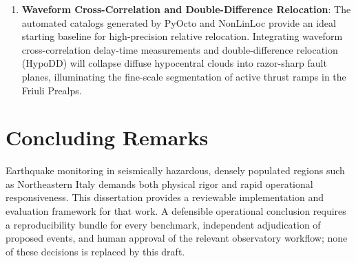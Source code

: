 \begin{enumerate}
    automatically deliver focal mechanism solutions for events with
    $M_{\mathrm{L}} \ge 2.5$ within minutes of origin.
  \item \textbf{Waveform Cross-Correlation and Double-Difference Relocation}:
    The automated catalogs generated by PyOcto and NonLinLoc provide
    an ideal starting baseline for high-precision relative
    relocation. Integrating waveform cross-correlation delay-time
    measurements and double-difference relocation (\ac{HypoDD}) will
    collapse diffuse hypocentral clouds into razor-sharp fault
    planes, illuminating the fine-scale segmentation of active
    thrust ramps in the Friuli Prealps.
\end{enumerate}

\section{Concluding Remarks}
\label{sec:conclusion_remarks}

Earthquake monitoring in seismically hazardous, densely populated
regions such as Northeastern Italy demands both physical rigor and
rapid operational responsiveness. This dissertation provides a
reviewable implementation and evaluation framework for that work. A
defensible operational conclusion requires a reproducibility bundle
for every benchmark, independent adjudication of proposed events,
and human approval of the relevant observatory workflow; none of
these decisions is replaced by this draft.
